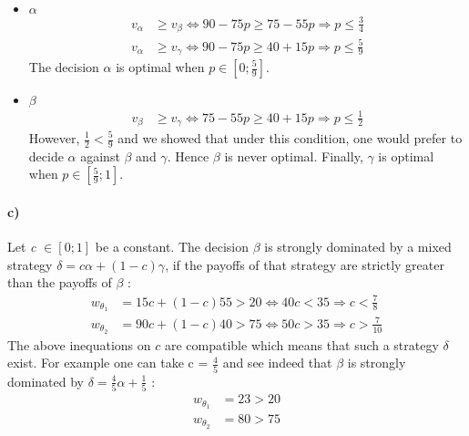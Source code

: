 \begin{itemize}
    \item $\alpha$
    \begin{align*}
        v_\alpha &\geq  v_\beta \Leftrightarrow 90 - 75p \geq 75 - 55 p \Rightarrow p\leq \frac{3}{4}\\
        v_\alpha &\geq  v_\gamma \Leftrightarrow 90 - 75p \geq 40 +15p \Rightarrow p\leq \frac{5}{9}
    \end{align*}
    The decision $\alpha$ is optimal when $p \in [0;\frac{5}{9}]$.
    \item $\beta$
    \begin{align*}
       v_\beta &\geq  v_\gamma \Leftrightarrow 75 - 55p \geq 40 +15p \Rightarrow p\leq \frac{1}{2}
    \end{align*}
    However, $\frac{1}{2} < \frac{5}{9}$ and we showed that under this condition, one would prefer to decide $ \alpha$ against $\beta$ and $\gamma$. Hence $\beta$ is never optimal. \newline
    Finally, $\gamma$ is optimal when $p\in [\frac{5}{9};1]$. 
\end{itemize}

\paragraph{c)}Let \textit{c} $\in[0;1]$ be a constant. The decision $\beta$ is strongly dominated by a mixed strategy $\delta = c\alpha + (1-c)\gamma $, if the payoffs of that strategy are strictly greater than the payoffs of $\beta$ : 
\begin{align*}
     w_{\theta_1} &= 15c + (1-c)55 > 20 \Leftrightarrow 40 c < 35 \Rightarrow c < \frac{7}{8} \\ 
     w_{\theta_2} &= 90c + (1-c)40 > 75 \Leftrightarrow 50 c > 35 \Rightarrow c > \frac{7}{10}
\end{align*}
The above inequations on $c$ are compatible which means that such a strategy $\delta$ exist. For example one can take c = $\frac{4}{5}$ and see indeed that $\beta$ is strongly dominated by $\delta = \frac{4}{5}\alpha + \frac{1}{5}$ : 
\begin{align*}
     w_{\theta_1} &= 23 > 20  \\ 
     w_{\theta_2} &= 80 > 75 
\end{align*}
